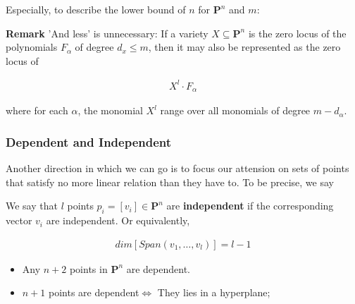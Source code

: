 \documentclass[Total.tex]{subfiles}
\begin{document}
			Especially, to describe the lower bound of $n$ for $\mathbf{P}^n$ and $m$: 
			
			\textbf{Remark} 'And less' is unnecessary:  If a variety $X\subseteq \mathbf{P}^n$ is the zero locus of the polynomials $F_\alpha$ of degree $d_x\leq m$, then it may also be represented as the zero locus of
			
			\begin{gather*}
				X^l\cdot F_\alpha
			\end{gather*}
			
			where for each $\alpha$, the monomial $X^l$ range over all monomials of degree $m-d_\alpha$.
			
			\subsubsection{Dependent and Independent} 
			
			Another direction in which we can go is to focus our attension on sets of points that satisfy no more linear relation than they have to. To be precise, we say
			
			\begin{Def}
				We say that $l$ points $p_i=[v_i]\in \mathbf{P}^n$ are \textbf{independent} if the corresponding vector $v_i$ are independent. Or equivalently,
				
				\begin{gather*}
					dim[Span(v_1,\dots,v_l)]=l-1
				\end{gather*}
			\end{Def}
			
			\begin{lemma}
				\begin{itemize}
					\item Any $n+2$ points in $\mathbf{P}^n$ are dependent.
					
					
					\item $n+1$ points are dependent$\Leftrightarrow$ They lies in a hyperplane;
				\end{itemize}
			\end{lemma}
			
\end{document}
